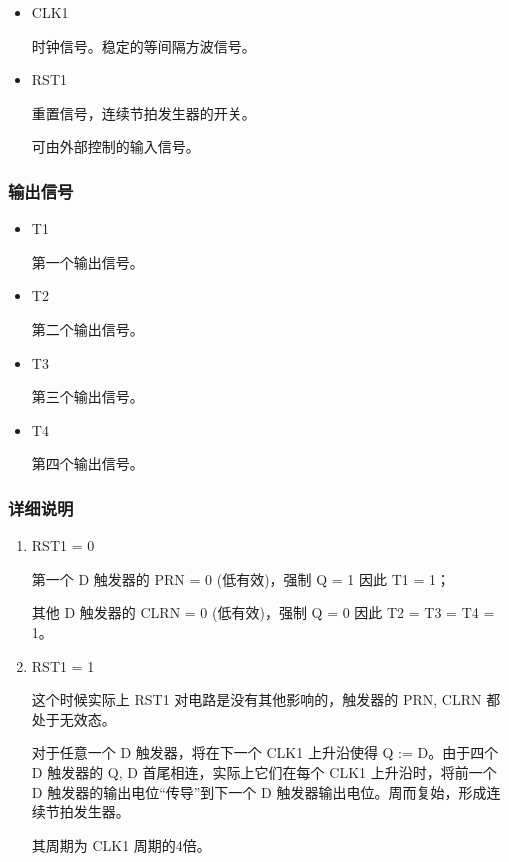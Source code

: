 \begin{itemize}
    \item CLK1
    
    时钟信号。稳定的等间隔方波信号。
    
    \item RST1
    
    重置信号，连续节拍发生器的开关。
    
    可由外部控制的输入信号。
    
\end{itemize} 

\subsubsection{输出信号}

\begin{itemize}
    \item T1
    
    第一个输出信号。
    
    \item T2
    
    第二个输出信号。

    \item T3

    第三个输出信号。

    \item T4
    
    第四个输出信号。

\end{itemize}

\subsubsection{详细说明}

\begin{enumerate}
    \item RST1 = 0
    
    第一个 D 触发器的 PRN = 0 (低有效)，强制 Q = 1 因此 T1 = 1；
    
    其他 D 触发器的 CLRN = 0 (低有效)，强制 Q = 0 因此 T2 = T3 = T4 = 1。
    
    \item RST1 = 1
    
    这个时候实际上 RST1 对电路是没有其他影响的，触发器的 PRN, CLRN 都处于无效态。
    
    对于任意一个 D 触发器，将在下一个 CLK1 上升沿使得 Q := D。由于四个 D 触发器的 Q, D 首尾相连，实际上它们在每个 CLK1 上升沿时，将前一个 D 触发器的输出电位“传导”到下一个 D 触发器输出电位。周而复始，形成连续节拍发生器。
    
    其周期为 CLK1 周期的4倍。
    
\end{enumerate}


